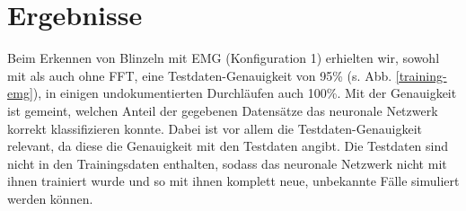 \documentclass[11pt]{scrartcl}
\begin{document}



	\section{Ergebnisse}

	Beim Erkennen von Blinzeln mit EMG (Konfiguration 1) erhielten wir, sowohl mit als auch ohne FFT, eine Testdaten-Genauigkeit von 95\% (s. Abb. \ref{training-emg}), in einigen undokumentierten Durchläufen auch 100\%. Mit der Genauigkeit ist gemeint, welchen Anteil der gegebenen Datensätze das neuronale Netzwerk korrekt klassifizieren konnte. Dabei ist vor allem die Testdaten-Genauigkeit relevant, da diese die Genauigkeit mit den Testdaten angibt. Die Testdaten sind nicht in den Trainingsdaten enthalten, sodass das neuronale Netzwerk nicht mit ihnen trainiert wurde und so mit ihnen komplett neue, unbekannte Fälle simuliert werden können.

	\begin{figure}[H]
	\end{figure}
\end{document}
